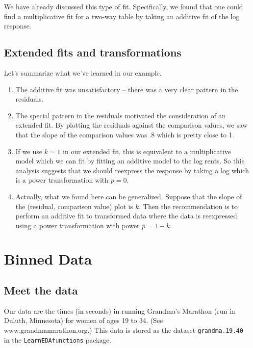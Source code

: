 \documentclass[
]{book}
\begin{document}
We have already discussed this type of fit. Specifically, we found that one could find a multiplicative fit for a two-way table by taking an additive fit of the log response.

\hypertarget{extended-fits-and-transformations}{%
\section{Extended fits and transformations}\label{extended-fits-and-transformations}}

Let's summarize what we've learned in our example.

\begin{enumerate}
\def\labelenumi{\arabic{enumi}.}
\item
  The additive fit was unsatisfactory -- there was a very clear pattern in the residuals.
\item
  The special pattern in the residuals motivated the consideration of an extended fit. By plotting the residuals against the comparison values, we saw that the slope of the comparison values was .8 which is pretty close to 1.
\item
  If we use \(k=1\) in our extended fit, this is equivalent to a multiplicative model which we can fit by fitting an additive model to the log rents. So this analysis suggests that we should reexpress the response by taking a log which is a power transformation with \(p = 0\).
\item
  Actually, what we found here can be generalized. Suppose that the slope of the (residual, comparison value) plot is \(k\). Then the recommendation is to perform an additive fit to transformed data where the data is reexpressed using a power transformation with power \(p = 1 - k\).
\end{enumerate}

\hypertarget{binned-data}{%
\chapter{Binned Data}\label{binned-data}}

\hypertarget{meet-the-data-9}{%
\section{Meet the data}\label{meet-the-data-9}}

Our data are the times (in seconds) in running Grandma's Marathon (run in Duluth, Minnesota) for women of ages 19 to 34. (See www.grandmamarathon.org.) This data is stored as the dataset \texttt{grandma.19.40} in the \texttt{LearnEDAfunctions} package.
\end{document}
